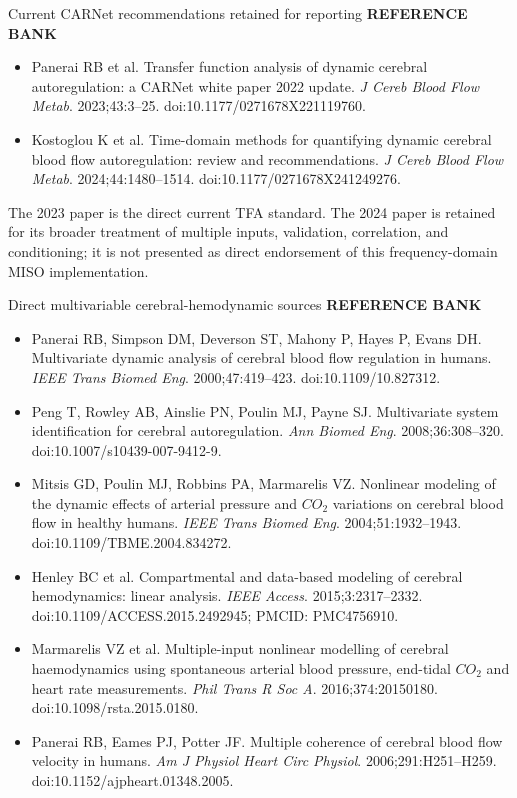 \documentclass[aspectratio=169,11pt]{beamer}
\newcommand{\sectionlabel}[1]{%
  {\color{Accent}\fontsize{8}{9.5}\selectfont\bfseries\MakeUppercase{#1}}\par\vspace{0.12cm}}
\begin{document}
\begin{frame}{Current CARNet recommendations retained for reporting}
\sectionlabel{Reference Bank}
\fontsize{9.4}{11.8}\selectfont
\begin{itemize}
  \item Panerai RB et al. Transfer function analysis of dynamic cerebral autoregulation: a CARNet white paper 2022 update. \emph{J Cereb Blood Flow Metab}. 2023;43:3--25. doi:10.1177/0271678X221119760.
  \item Kostoglou K et al. Time-domain methods for quantifying dynamic cerebral blood flow autoregulation: review and recommendations. \emph{J Cereb Blood Flow Metab}. 2024;44:1480--1514. doi:10.1177/0271678X241249276.
\end{itemize}

\vspace{0.18cm}
The 2023 paper is the direct current TFA standard. The 2024 paper is retained
for its broader treatment of multiple inputs, validation, correlation, and
conditioning; it is not presented as direct endorsement of this frequency-domain
MISO implementation.
\end{frame}

\begin{frame}{Direct multivariable cerebral-hemodynamic sources}
\sectionlabel{Reference Bank}
\fontsize{8.5}{10.6}\selectfont
\begin{itemize}
  \item Panerai RB, Simpson DM, Deverson ST, Mahony P, Hayes P, Evans DH. Multivariate dynamic analysis of cerebral blood flow regulation in humans. \emph{IEEE Trans Biomed Eng}. 2000;47:419--423. doi:10.1109/10.827312.
  \item Peng T, Rowley AB, Ainslie PN, Poulin MJ, Payne SJ. Multivariate system identification for cerebral autoregulation. \emph{Ann Biomed Eng}. 2008;36:308--320. doi:10.1007/s10439-007-9412-9.
  \item Mitsis GD, Poulin MJ, Robbins PA, Marmarelis VZ. Nonlinear modeling of the dynamic effects of arterial pressure and $CO_2$ variations on cerebral blood flow in healthy humans. \emph{IEEE Trans Biomed Eng}. 2004;51:1932--1943. doi:10.1109/TBME.2004.834272.
  \item Henley BC et al. Compartmental and data-based modeling of cerebral hemodynamics: linear analysis. \emph{IEEE Access}. 2015;3:2317--2332. doi:10.1109/ACCESS.2015.2492945; PMCID: PMC4756910.
  \item Marmarelis VZ et al. Multiple-input nonlinear modelling of cerebral haemodynamics using spontaneous arterial blood pressure, end-tidal $CO_2$ and heart rate measurements. \emph{Phil Trans R Soc A}. 2016;374:20150180. doi:10.1098/rsta.2015.0180.
  \item Panerai RB, Eames PJ, Potter JF. Multiple coherence of cerebral blood flow velocity in humans. \emph{Am J Physiol Heart Circ Physiol}. 2006;291:H251--H259. doi:10.1152/ajpheart.01348.2005.
\end{itemize}
\end{frame}
\end{document}
